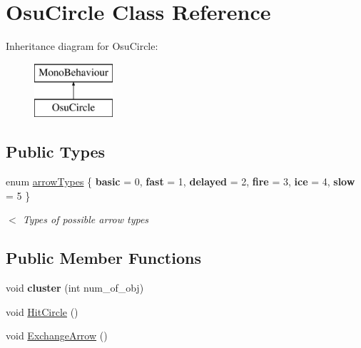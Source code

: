 \hypertarget{class_osu_circle}{}\section{Osu\+Circle Class Reference}
\label{class_osu_circle}
Inheritance diagram for Osu\+Circle\+:\begin{figure}[H]
\begin{center}
\leavevmode
\includegraphics[height=2.000000cm]{class_osu_circle}
\end{center}
\end{figure}
\subsection*{Public Types}
\begin{DoxyCompactItemize}
\item 
\mbox{\label{class_osu_circle_af50d7f27362dacb1dc3b3825cee7f837}} 
enum \hyperlink{class_osu_circle_af50d7f27362dacb1dc3b3825cee7f837}{arrow\+Types} \{ \newline
{\bfseries basic} = 0, 
{\bfseries fast} = 1, 
{\bfseries delayed} = 2, 
{\bfseries fire} = 3, 
\newline
{\bfseries ice} = 4, 
{\bfseries slow} = 5
 \}\begin{DoxyCompactList}\small\item\em $<$ Types of possible arrow types \end{DoxyCompactList}
\end{DoxyCompactItemize}
\subsection*{Public Member Functions}
\begin{DoxyCompactItemize}
\item 
\mbox{\label{class_osu_circle_a108fbacb0b9c0261fddddb8c4212f474}} 
void {\bfseries cluster} (int num\+\_\+of\+\_\+obj)
\item 
void \hyperlink{class_osu_circle_ac1bcc007ef49c6e9de959168eea7bca4}{Hit\+Circle} ()
\item 
void \hyperlink{class_osu_circle_ae655fb82998de93d7542cb77f3ad406b}{Exchange\+Arrow} ()
\end{DoxyCompactItemize}
